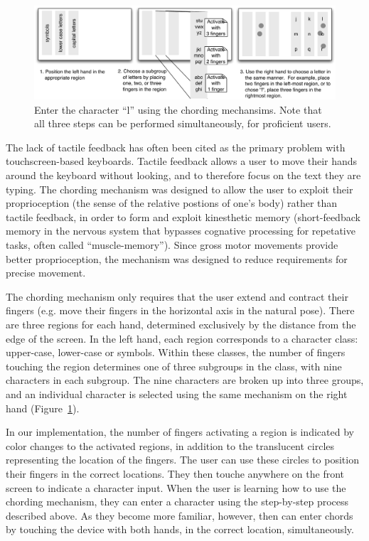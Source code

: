 \begin{figure}
    \includegraphics[width=\textwidth]{Figures/chording_explaination.pdf} 
    \caption{Enter the character ``l'' using the chording mechansims.
      Note that all three steps can be performed simultaneously, for
      proficient users.}
    \label{fig:chording_explaination}
\end{figure} 

The lack of tactile feedback has often been cited as the primary
problem with touchscreen-based keyboards.  Tactile feedback allows a
user to move their hands around the keyboard without looking, and to
therefore focus on the text they are typing.  The chording mechanism
was designed to allow the user to exploit their proprioception (the
sense of the relative postions of one's body) rather than tactile
feedback, in order to form and exploit kinesthetic memory
(short-feedback memory in the nervous system that bypasses cognative
processing for repetative tasks, often called ``muscle-memory'').
Since gross motor movements provide better proprioception, the
mechanism was designed to reduce requirements for precise movement.

The chording mechanism only requires that the user extend and contract
their fingers (e.g. move their fingers in the horizontal axis in the
natural pose).  There are three regions for each hand, determined
exclusively by the distance from the edge of the screen.  In the left
hand, each region corresponds to a character class: upper-case,
lower-case or symbols.  Within these classes, the number of fingers
touching the region determines one of three subgroups in the class,
with nine characters in each subgroup.  The nine characters are broken
up into three groups, and an individual character is selected using
the same mechanism on the right hand
(Figure~\ref{fig:chording_explaination}).

In our implementation, the number of fingers activating a region is
indicated by color changes to the activated regions, in addition to
the translucent circles representing the location of the fingers.
The user can use these circles to position their fingers in the correct
locations.  They then touche anywhere on the front screen to
indicate a character input.  When the user is learning how to use the
chording mechanism, they can enter a character using the step-by-step
process described above.  As they become more familiar, however, then
can enter chords by touching the device with both hands, in the
correct location, simultaneously.

